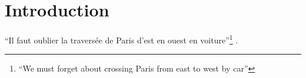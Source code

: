 \documentclass[preprint, 3p,
authoryear]{elsarticle} %
\begin{document}
\hypertarget{introduction}{%
\section{Introduction}\label{introduction}}

``Il faut oublier la traversée de Paris d'est en ouest en
voiture''\footnote{ ``We must forget about crossing Paris from east to
  west by car''} \citep{alimi2020}.

\citet{knight2018walkable} \citet{liu2022toward}
\citet{pozoukidou2021fifteen} \citet{weng2019fifteen}

\renewcommand\refname{References}

\end{document}
